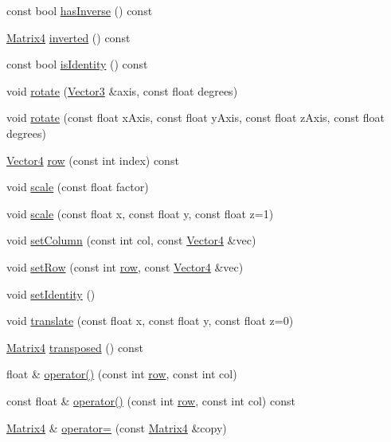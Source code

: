 \begin{DoxyCompactItemize}
\item 
const bool \hyperlink{classprism_1_1_matrix4_af9da747da374bbcb3c1eb86888445a04}{has\+Inverse} () const 
\item 
\hyperlink{classprism_1_1_matrix4}{Matrix4} \hyperlink{classprism_1_1_matrix4_a9fd394a4623bf877c816d3ee32a65398}{inverted} () const 
\item 
const bool \hyperlink{classprism_1_1_matrix4_a5e194c959cdab2ae9c0aa3a012aea3f5}{is\+Identity} () const 
\item 
void \hyperlink{classprism_1_1_matrix4_a069ba54a3d94b97ba73a067b677cb2dc}{rotate} (\hyperlink{classprism_1_1_vector3}{Vector3} \&axis, const float degrees)
\item 
void \hyperlink{classprism_1_1_matrix4_a633a54c0577f3119a5f27223df0945e4}{rotate} (const float x\+Axis, const float y\+Axis, const float z\+Axis, const float degrees)
\item 
\hyperlink{classprism_1_1_vector4}{Vector4} \hyperlink{classprism_1_1_matrix4_a3915b1b0eae6e7bd4aefcec1dd3d863a}{row} (const int index) const 
\item 
void \hyperlink{classprism_1_1_matrix4_a0157b4bb139f75e976ac56b33050c2f5}{scale} (const float factor)
\item 
void \hyperlink{classprism_1_1_matrix4_af25057a3429811c2bd0b2993fec88f30}{scale} (const float x, const float y, const float z=1)
\item 
void \hyperlink{classprism_1_1_matrix4_a06679d8db408ff8224f458f1043fb7d4}{set\+Column} (const int col, const \hyperlink{classprism_1_1_vector4}{Vector4} \&vec)
\item 
void \hyperlink{classprism_1_1_matrix4_a5c2b6f016995575308091c7e79554ea8}{set\+Row} (const int \hyperlink{classprism_1_1_matrix4_a3915b1b0eae6e7bd4aefcec1dd3d863a}{row}, const \hyperlink{classprism_1_1_vector4}{Vector4} \&vec)
\item 
void \hyperlink{classprism_1_1_matrix4_af1be8b0e450e975534b7c1bbedb2dadc}{set\+Identity} ()
\item 
void \hyperlink{classprism_1_1_matrix4_a641fbb2e58403f03f18295afac0a028a}{translate} (const float x, const float y, const float z=0)
\item 
\hyperlink{classprism_1_1_matrix4}{Matrix4} \hyperlink{classprism_1_1_matrix4_a69fd0bae9a82c8fd6ef6437c91f37fab}{transposed} () const 
\item 
float \& \hyperlink{classprism_1_1_matrix4_a6415d46405799de0c92b91f227a77631}{operator()} (const int \hyperlink{classprism_1_1_matrix4_a3915b1b0eae6e7bd4aefcec1dd3d863a}{row}, const int col)
\item 
const float \& \hyperlink{classprism_1_1_matrix4_a2e80dc870b4b71f06c8bb97ef7d22d90}{operator()} (const int \hyperlink{classprism_1_1_matrix4_a3915b1b0eae6e7bd4aefcec1dd3d863a}{row}, const int col) const 
\item 
\hyperlink{classprism_1_1_matrix4}{Matrix4} \& \hyperlink{classprism_1_1_matrix4_aa31f05b184217ef3ab902d6aa469500d}{operator=} (const \hyperlink{classprism_1_1_matrix4}{Matrix4} \&copy)
\end{DoxyCompactItemize}
